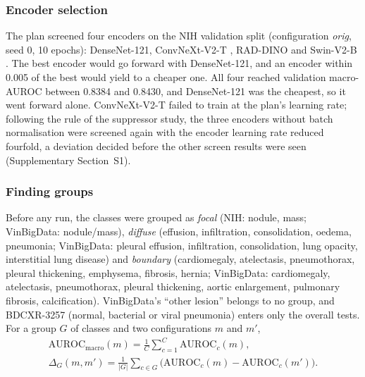 \subsubsection{Encoder selection}
The plan screened four encoders on the NIH validation split (configuration \emph{orig}, seed 0, 10 epochs): DenseNet-121, ConvNeXt-V2-T
\cite{woo2023convnextv2}, RAD-DINO \cite{perezgarcia2025raddino} and Swin-V2-B \cite{liu2022swinv2}. The best encoder would go forward with
DenseNet-121, and an encoder within 0.005 of the best would yield to a cheaper one. All four reached validation macro-AUROC between 0.8384
and 0.8430, and DenseNet-121 was the cheapest, so it went forward alone. ConvNeXt-V2-T failed to train at the plan's learning rate;
following the rule of the suppressor study, the three encoders without batch normalisation were screened again with the encoder learning
rate reduced fourfold, a deviation decided before the other screen results were seen (Supplementary Section~S1).

\subsubsection{Finding groups}
Before any run, the classes were grouped as \emph{focal} (NIH: nodule, mass; VinBigData: nodule/mass), \emph{diffuse} (effusion,
infiltration, consolidation, oedema, pneumonia; VinBigData: pleural effusion, infiltration, consolidation, lung opacity, interstitial lung
disease) and \emph{boundary} (cardiomegaly, atelectasis, pneumothorax, pleural thickening, emphysema, fibrosis, hernia; VinBigData:
cardiomegaly, atelectasis, pneumothorax, pleural thickening, aortic enlargement, pulmonary fibrosis, calcification). VinBigData's ``other
lesion'' belongs to no group, and BDCXR-3257 (normal, bacterial or viral pneumonia) enters only the overall tests. For a group $G$ of classes
and two configurations $m$ and $m'$,
\begin{equation}
\begin{gathered}
\mathrm{AUROC}_{\mathrm{macro}}(m)=\frac1C\sum_{c=1}^{C}\mathrm{AUROC}_c(m),\\
\Delta_G(m,m')=\frac{1}{|G|}\sum_{c\in G}\big(\mathrm{AUROC}_c(m)-\mathrm{AUROC}_c(m')\big).
\end{gathered}
\label{eq:group}
\end{equation}

